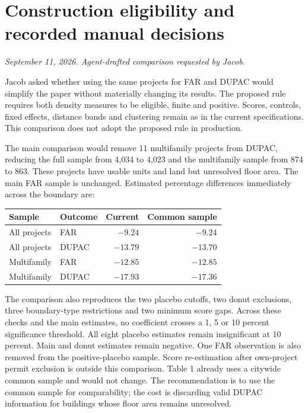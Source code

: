 \section*{Construction eligibility and recorded manual decisions}
\textit{September 11, 2026. Agent-drafted comparison requested by Jacob.}

Jacob asked whether using the same projects for FAR and DUPAC would simplify the
paper without materially changing its results. The proposed rule requires both
density measures to be eligible, finite and positive. Scores, controls, fixed
effects, distance bands and clustering remain as in the current specifications.
This comparison does not adopt the proposed rule in production.

The main comparison would remove 11 multifamily projects from DUPAC, reducing
the full sample from 4,034 to 4,023 and the multifamily sample from 874 to 863.
These projects have usable units and land but unresolved floor area. The main
FAR sample is unchanged. Estimated percentage differences immediately across
the boundary are:

\begin{center}
\begin{tabular}{llrr}
Sample & Outcome & Current & Common sample \\
\hline
All projects & FAR & $-9.24$ & $-9.24$ \\
All projects & DUPAC & $-13.79$ & $-13.70$ \\
Multifamily & FAR & $-12.85$ & $-12.85$ \\
Multifamily & DUPAC & $-17.93$ & $-17.36$ \\
\end{tabular}
\end{center}

The comparison also reproduces the two placebo cutoffs, two donut exclusions,
three boundary-type restrictions and two minimum score gaps. Across these
checks and the main estimates, no coefficient crosses a 1, 5 or 10 percent
significance threshold. All eight placebo estimates remain insignificant at
10 percent. Main and donut estimates remain negative. One FAR observation is
also removed from the positive-placebo sample. Score re-estimation after
own-project permit exclusion is outside this comparison. Table 1 already uses
a citywide common sample and would not change. The recommendation is to use the
common sample for comparability; the cost is discarding valid DUPAC information
for buildings whose floor area remains unresolved.


